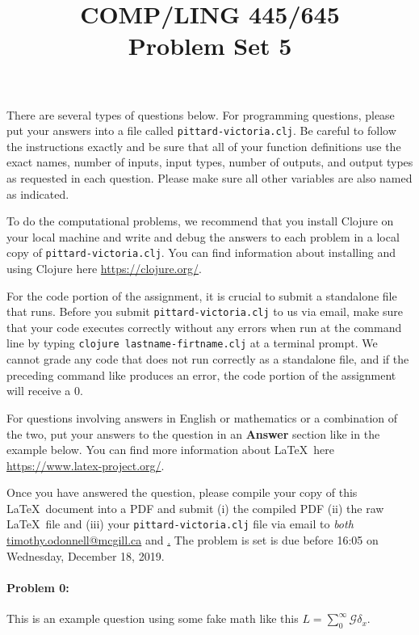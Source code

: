 \documentclass[10pt]{article}
\begin{document}
 
\title{COMP/LING 445/645\\Problem Set 5}
\date{}
\maketitle

There are several types of questions below. For programming questions,
please put your answers into a file called
\texttt{pittard-victoria.clj}. Be careful to follow the instructions
exactly and be sure that all of your function definitions use the
exact names, number of inputs, input types, number of outputs, and
output types as requested in each question. Please make sure all other
variables are also named as indicated.

To do the computational problems, we recommend that you install
Clojure on your local machine and write and debug the answers to each
problem in a local copy of \texttt{pittard-victoria.clj}. You can
find information about installing and using Clojure here
\url{https://clojure.org/}.

For the code portion of the assignment, it is crucial to submit a
standalone file that runs. Before you submit
\texttt{pittard-victoria.clj} to us via email, make sure that your
code executes correctly without any errors when run at the command
line by typing \texttt{clojure lastname-firtname.clj} at a terminal
prompt. We cannot grade any code that does not run correctly as a
standalone file, and if the preceding command like produces an error,
the code portion of the assignment will receive a $0$.

For questions involving answers in English or mathematics or a
combination of the two, put your answers to the question in an
\textbf{Answer} section like in the example below. You can find more
information about \LaTeX\ here \url{https://www.latex-project.org/}.

Once you have answered the question, please compile your copy of this
\LaTeX\ document into a PDF and submit (i) the compiled PDF (ii) the
raw \LaTeX\ file and (iii) your \texttt{pittard-victoria.clj} file
via email to \emph{both}
\href{mailto:timothy.odonnell@mcgill.ca}{timothy.odonnell@mcgill.ca}
and
\href{mailto:savanna.willerton@mail.mcgill.ca}\href{savanna.willerton@mail.mcgill.ca}.
The problem is set is due before 16:05 on Wednesday, December 18, 2019.

\hrulefill
\paragraph{Problem 0:}
This is an example question using some fake math like this
$L=\sum_0^{\infty} \mathcal{G} \delta_x$.
\end{document}
